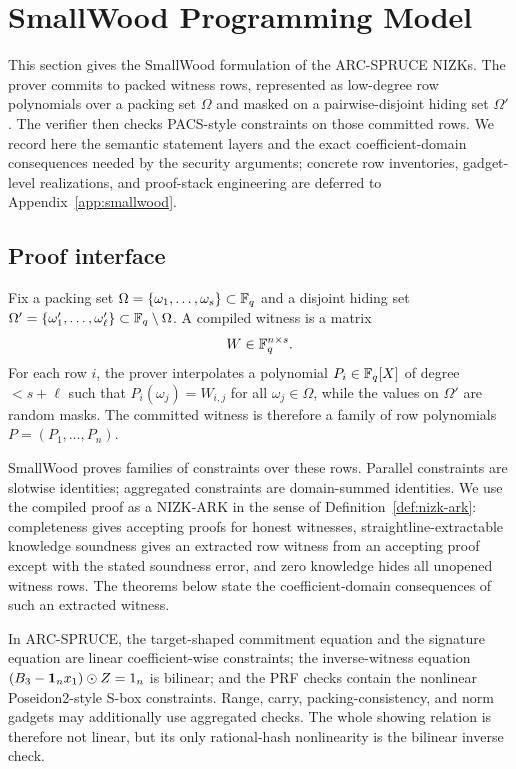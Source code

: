 \section{SmallWood Programming Model}
\label{sec:smallwood-model}
\label{sec:smallwood}

This section gives the SmallWood formulation of the ARC-SPRUCE NIZKs.  The prover commits to packed witness
rows, represented as low-degree row polynomials over a packing set \(\Omega\) and masked on a pairwise-disjoint
hiding set \(\Omega'\).  The verifier then checks PACS-style constraints on those committed rows.  We record here
the semantic statement layers and the exact coefficient-domain consequences needed by the security arguments;
concrete row inventories, gadget-level realizations, and proof-stack engineering are deferred to
Appendix~\ref{app:smallwood}.

\subsection{Proof interface}
\label{subsec:smallwood-interface}
Fix a packing set \(\Omega=\{\omega_1,\ldots,\omega_s\}\subset\mathbb{F}_q\) and a disjoint hiding set
\(\Omega'=\{\omega'_1,\ldots,\omega'_\ell\}\subset\mathbb{F}_q\setminus\Omega\).  A compiled witness is a matrix
\[
W\in\mathbb{F}_q^{n\times s}.
\]
For each row \(i\), the prover interpolates a polynomial \(P_i\in\mathbb{F}_q[X]\) of degree \(<s+\ell\) such that
\(P_i(\omega_j)=W_{i,j}\) for all \(\omega_j\in\Omega\), while the values on \(\Omega'\) are random masks.  The
committed witness is therefore a family of row polynomials \(P=(P_1,\ldots,P_n)\).

SmallWood proves families of constraints over these rows.  Parallel constraints are slotwise identities; aggregated
constraints are domain-summed identities.  We use the compiled proof as a NIZK-ARK in the sense of
Definition~\ref{def:nizk-ark}: completeness gives accepting proofs for honest witnesses, straightline-extractable
knowledge soundness gives an extracted row witness from an accepting proof except with the stated soundness error,
and zero knowledge hides all unopened witness rows.  The theorems below state the coefficient-domain consequences
of such an extracted witness.

In ARC-SPRUCE, the target-shaped commitment equation and the signature equation are linear coefficient-wise
constraints; the inverse-witness equation \((B_3-\mathbf 1_nx_1)\odot Z=1_n\) is bilinear; and the PRF checks contain
the nonlinear Poseidon2-style S-box constraints.  Range, carry, packing-consistency, and norm gadgets may additionally
use aggregated checks.  The whole showing relation is therefore not linear, but its only rational-hash nonlinearity is
the bilinear inverse check.

